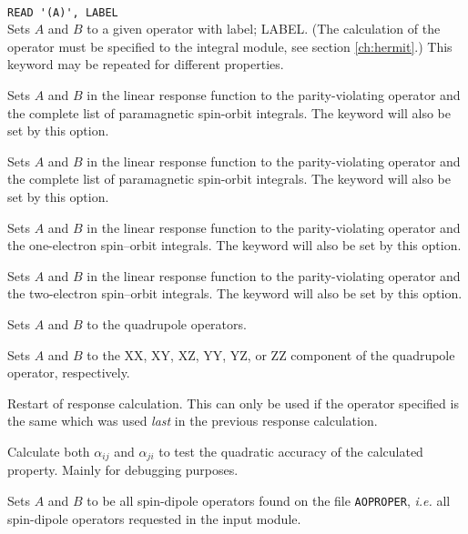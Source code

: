 \begin{description}
\item{}\\
\verb|READ '(A)', LABEL|\\
Sets $A$ and $B$ to a given operator with label; LABEL.
(The calculation of the operator must be specified to the integral
module, see section \ref{ch:hermit}.)
This keyword may be repeated for different properties.

\item{} Sets $A$ and $B$ in the linear response function
  to the parity-violating operator and the complete list of
  paramagnetic spin-orbit integrals. The  keyword will
  also be set by this option.

\item{} Sets $A$ and $B$ in the linear response function
  to the parity-violating operator and the complete list of
  paramagnetic spin-orbit integrals. The  keyword will
  also be set by this option.

\item{} Sets $A$ and $B$ in the linear response function
  to the parity-violating operator and the one-electron spin--orbit
  integrals. The  keyword will
  also be set by this option.

\item{} Sets $A$ and $B$ in the linear response function
  to the parity-violating operator and the two-electron spin--orbit
  integrals. The  keyword will
  also be set by this option.

\item{}
Sets $A$ and $B$ to the quadrupole operators.

\item{}
Sets $A$ and $B$ to the XX, XY, XZ, YY, YZ, or ZZ component of the
quadrupole operator, respectively.

\item{}
Restart of response calculation. This
can only be used if the
operator specified is the same which was used \textit{last} in the previous
response calculation.

\item{} Calculate both $\alpha_{ij}$ and $\alpha_{ji}$ to
  test the quadratic accuracy of the calculated property. Mainly for
  debugging purposes.

\item{} Sets $A$ and $B$ to be all spin-dipole operators
  found on the file \verb|AOPROPER|, {\it i.e.\/} all spin-dipole
  operators requested in the  input module.


\end{description}
